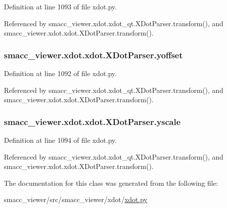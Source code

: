 Definition at line 1093 of file xdot.\+py.



Referenced by smacc\+\_\+viewer.\+xdot.\+xdot\+\_\+qt.\+X\+Dot\+Parser.\+transform(), and smacc\+\_\+viewer.\+xdot.\+xdot.\+X\+Dot\+Parser.\+transform().

\subsubsection[{\texorpdfstring{yoffset}{yoffset}}]{\setlength{\rightskip}{0pt plus 5cm}smacc\+\_\+viewer.\+xdot.\+xdot.\+X\+Dot\+Parser.\+yoffset}\hypertarget{classsmacc__viewer_1_1xdot_1_1xdot_1_1XDotParser_ac9489fc14a7ba7229f965c327b479385}{}\label{classsmacc__viewer_1_1xdot_1_1xdot_1_1XDotParser_ac9489fc14a7ba7229f965c327b479385}


Definition at line 1092 of file xdot.\+py.



Referenced by smacc\+\_\+viewer.\+xdot.\+xdot\+\_\+qt.\+X\+Dot\+Parser.\+transform(), and smacc\+\_\+viewer.\+xdot.\+xdot.\+X\+Dot\+Parser.\+transform().

\subsubsection[{\texorpdfstring{yscale}{yscale}}]{\setlength{\rightskip}{0pt plus 5cm}smacc\+\_\+viewer.\+xdot.\+xdot.\+X\+Dot\+Parser.\+yscale}\hypertarget{classsmacc__viewer_1_1xdot_1_1xdot_1_1XDotParser_a89fee1a8bb775af0509be2bce06b6e34}{}\label{classsmacc__viewer_1_1xdot_1_1xdot_1_1XDotParser_a89fee1a8bb775af0509be2bce06b6e34}


Definition at line 1094 of file xdot.\+py.



Referenced by smacc\+\_\+viewer.\+xdot.\+xdot\+\_\+qt.\+X\+Dot\+Parser.\+transform(), and smacc\+\_\+viewer.\+xdot.\+xdot.\+X\+Dot\+Parser.\+transform().



The documentation for this class was generated from the following file\+:\begin{DoxyCompactItemize}
\item 
smacc\+\_\+viewer/src/smacc\+\_\+viewer/xdot/\hyperlink{xdot_8py}{xdot.\+py}\end{DoxyCompactItemize}
